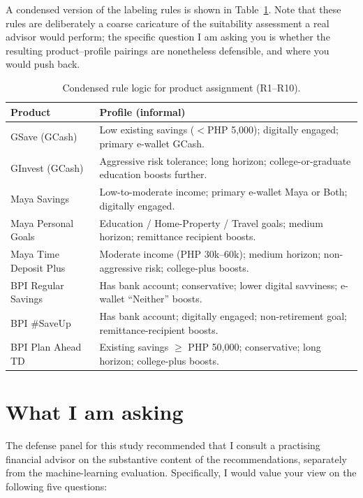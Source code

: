 \documentclass[11pt,a4paper]{article}
\begin{document}
A condensed version of the labeling rules is shown in
Table~\ref{tab:rules}. Note that these rules are deliberately a coarse
caricature of the suitability assessment a real advisor would perform; the
specific question I am asking you is whether the resulting product--profile
pairings are nonetheless defensible, and where you would push back.

\begin{table}[h]
    \centering
    \footnotesize
    \caption{Condensed rule logic for product assignment (R1--R10).}
    \label{tab:rules}
    \begin{tabular}{p{2.4cm}p{12cm}}
        \toprule
        \textbf{Product} & \textbf{Profile (informal)} \\
        \midrule
        GSave (GCash)            & Low existing savings ($<$PHP 5{,}000); digitally engaged; primary e-wallet GCash. \\
        GInvest (GCash)          & Aggressive risk tolerance; long horizon; college-or-graduate education boosts further. \\
        Maya Savings             & Low-to-moderate income; primary e-wallet Maya or Both; digitally engaged. \\
        Maya Personal Goals      & Education / Home-Property / Travel goals; medium horizon; remittance recipient boosts. \\
        Maya Time Deposit Plus   & Moderate income (PHP 30k--60k); medium horizon; non-aggressive risk; college-plus boosts. \\
        BPI Regular Savings      & Has bank account; conservative; lower digital savviness; e-wallet ``Neither'' boosts. \\
        BPI \#SaveUp             & Has bank account; digitally engaged; non-retirement goal; remittance-recipient boosts. \\
        BPI Plan Ahead TD        & Existing savings $\geq$ PHP 50{,}000; conservative; long horizon; college-plus boosts. \\
        \bottomrule
    \end{tabular}
\end{table}


\section*{What I am asking}

The defense panel for this study recommended that I consult a practising
financial advisor on the substantive content of the recommendations,
separately from the machine-learning evaluation. Specifically, I would value
your view on the following five questions:
\end{document}
